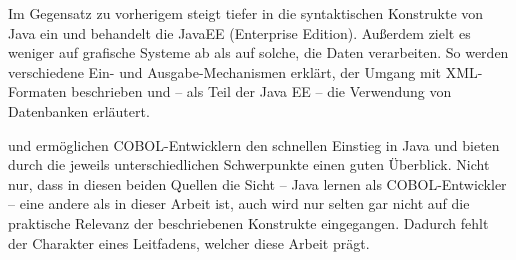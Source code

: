 Im Gegensatz zu vorherigem steigt  tiefer in die syntaktischen Konstrukte von Java ein und behandelt die JavaEE (Enterprise Edition). Außerdem zielt es weniger auf grafische Systeme ab als auf solche, die Daten verarbeiten. So werden verschiedene Ein- und Ausgabe-Mechanismen erklärt, der Umgang mit XML-Formaten beschrieben und -- als Teil der Java EE -- die Verwendung von Datenbanken erläutert.

 und  ermöglichen COBOL-Entwicklern den schnellen Einstieg in Java und bieten durch die jeweils unterschiedlichen Schwerpunkte einen guten Überblick. Nicht nur, dass in diesen beiden Quellen die Sicht -- Java lernen als COBOL-Entwickler -- eine andere als in dieser Arbeit ist, auch wird nur selten \bzw gar nicht auf die praktische Relevanz der beschriebenen Konstrukte eingegangen. Dadurch fehlt der Charakter eines Leitfadens, welcher diese Arbeit prägt. 